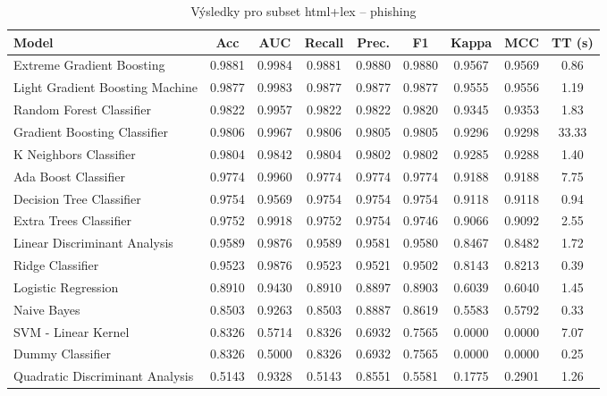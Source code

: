 \begin{table}[H]
  \centering
  \small
  \caption{Výsledky pro subset html+lex – phishing}
  \begin{tabular}{|l|c|c|c|c|c|c|c|c|}
    \hline
    \textbf{Model} & \textbf{Acc} & \textbf{AUC} & \textbf{Recall} & \textbf{Prec.} & \textbf{F1} & \textbf{Kappa} & \textbf{MCC} & \textbf{TT (s)} \\
    \hline
    Extreme Gradient Boosting & 0.9881 & 0.9984 & 0.9881 & 0.9880 & 0.9880 & 0.9567 & 0.9569 & 0.86 \\
    Light Gradient Boosting Machine & 0.9877 & 0.9983 & 0.9877 & 0.9877 & 0.9877 & 0.9555 & 0.9556 & 1.19 \\
    Random Forest Classifier & 0.9822 & 0.9957 & 0.9822 & 0.9822 & 0.9820 & 0.9345 & 0.9353 & 1.83 \\
    Gradient Boosting Classifier & 0.9806 & 0.9967 & 0.9806 & 0.9805 & 0.9805 & 0.9296 & 0.9298 & 33.33 \\
    K Neighbors Classifier & 0.9804 & 0.9842 & 0.9804 & 0.9802 & 0.9802 & 0.9285 & 0.9288 & 1.40 \\
    Ada Boost Classifier & 0.9774 & 0.9960 & 0.9774 & 0.9774 & 0.9774 & 0.9188 & 0.9188 & 7.75 \\
    Decision Tree Classifier & 0.9754 & 0.9569 & 0.9754 & 0.9754 & 0.9754 & 0.9118 & 0.9118 & 0.94 \\
    Extra Trees Classifier & 0.9752 & 0.9918 & 0.9752 & 0.9754 & 0.9746 & 0.9066 & 0.9092 & 2.55 \\
    Linear Discriminant Analysis & 0.9589 & 0.9876 & 0.9589 & 0.9581 & 0.9580 & 0.8467 & 0.8482 & 1.72 \\
    Ridge Classifier & 0.9523 & 0.9876 & 0.9523 & 0.9521 & 0.9502 & 0.8143 & 0.8213 & 0.39 \\
    Logistic Regression & 0.8910 & 0.9430 & 0.8910 & 0.8897 & 0.8903 & 0.6039 & 0.6040 & 1.45 \\
    Naive Bayes & 0.8503 & 0.9263 & 0.8503 & 0.8887 & 0.8619 & 0.5583 & 0.5792 & 0.33 \\
    SVM - Linear Kernel & 0.8326 & 0.5714 & 0.8326 & 0.6932 & 0.7565 & 0.0000 & 0.0000 & 7.07 \\
    Dummy Classifier & 0.8326 & 0.5000 & 0.8326 & 0.6932 & 0.7565 & 0.0000 & 0.0000 & 0.25 \\
    Quadratic Discriminant Analysis & 0.5143 & 0.9328 & 0.5143 & 0.8551 & 0.5581 & 0.1775 & 0.2901 & 1.26 \\
    \hline
  \end{tabular}
\end{table}
\vspace{0.5cm}

